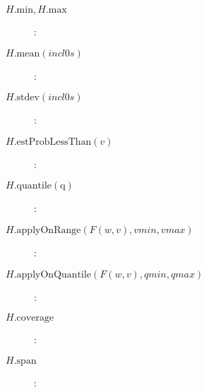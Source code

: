 \begin{description}

\item[$H.\mathrm{min}, H.\mathrm{max}$]: 

\item[$H.\mathrm{mean}(\mathit{incl0s})$]: 

\item[$H.\mathrm{stdev}(\mathit{incl0s})$]: 

\item[$H.\mathrm{estProbLessThan}(v)$]: 

\item[$H.\mathrm{quantile(q)}$]: 

\item[$H.\mathrm{applyOnRange}(F(w,v),\mathit{vmin},\mathit{vmax})$]: 

\item[$H.\mathrm{applyOnQuantile}(F(w,v),\mathit{qmin},\mathit{qmax})$]: 

\item[$H.\mathrm{coverage}$]: 

\item[$H.\mathrm{span}$]: 

\end{description}


